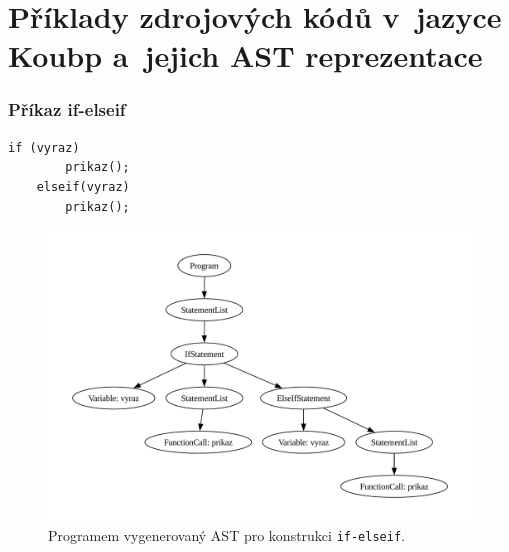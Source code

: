 
%


\chapter{Příklady zdrojových kódů v~jazyce Koubp a~jejich AST reprezentace}\label{kap_priloha_a}

\subsection*{Příkaz if-elseif}
\begin{lstlisting}[language=Koubp]
    if (vyraz)
        prikaz();
    elseif(vyraz)
        prikaz();
\end{lstlisting}
\begin{figure}[ht]
    \centering
    \includegraphics[width=\textwidth]{obrazky-figures/ast_if_elseif.pdf}
    \caption{Programem vygenerovaný AST pro konstrukci \texttt{if-elseif}.}
    \label{fig_ast_elseif}
\end{figure}

